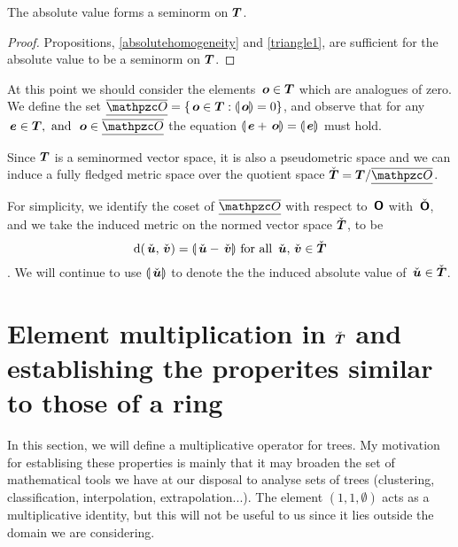 \begin{corollary}\label{gseminorm}
  The absolute value forms a seminorm on $\boldsymbol{T}$.
  \begin{proof}  
    Propositions, \ref{absolutehomogeneity} and \ref{triangle1}, are 
    sufficient for the absolute value to be a seminorm on
    $\boldsymbol{T}$.
  \end{proof}
\end{corollary}

At this point we should consider the elements
$\,\boldsymbol{o} \in \boldsymbol{T}$
which are analogues of zero. We define the set
$\nullspace =\{\node{o}\in\DOM : \nabs{\node{o}} = 0\}$,
and observe that for any
$\node{e} \in \DOM, \mand \node{o} \in \nullspace$
the equation
$\llparenthesis{\,\boldsymbol{e} + \,\boldsymbol{o}}\rrparenthesis = \llparenthesis{\,\boldsymbol{e}}\rrparenthesis$
must hold. 

Since $\boldsymbol{T}$ is a seminormed vector space, it is also a pseudometric
space and we can induce a fully fledged metric space over the quotient
space $\DOMQ = \DOM / \nullspace$.

For simplicity, we identify the coset of $\nullspace$ with respect to
$\,\boldsymbol{\mathsf{O}}$ with $\,\check{\boldsymbol{\mathsf{O}}}$, and we take the induced metric on the
normed vector space $\check{\boldsymbol{T}}$, to be
\[\operatorname{d}(\,\check{\boldsymbol{u}},\,\check{\boldsymbol{v}}) =
\llparenthesis{\,\check{\boldsymbol{u}} - \,\check{\boldsymbol{v}}}\rrparenthesis \text{ for all }\,\check{\boldsymbol{u}}, \,\check{\boldsymbol{v}} \in
\check{\boldsymbol{T}}\].  We will continue to use \(\llparenthesis{\,\check{\boldsymbol{u}}}\rrparenthesis\) to denote the
the induced absolute value of \(\,\check{\boldsymbol{u}}\in\check{\boldsymbol{T}}\).




\section{Element multiplication in $\check{\boldsymbol{T}}$ and establishing the
  properites similar to those of a ring}

In this section, we will define a multiplicative operator for
trees. My motivation for establising these properties is mainly that
it may broaden the set of mathematical tools we have at our
disposal to analyse sets of trees (clustering, classification,
interpolation, extrapolation...).  The element \((1,1,\emptyset)\)
acts as a multiplicative identity, but this will not be useful to us
since it lies outside the domain we are considering.

